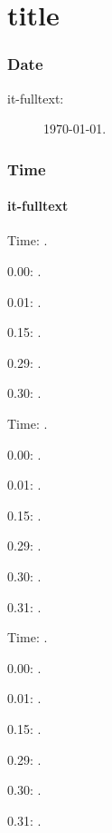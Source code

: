 \documentclass[italian]{article}
\begin{document}
\part{title}\section{Date}

\begin{description}
\item[it-fulltext:]
\today.
\end{description}

\section{Time}
\subsection{it-fulltext}
Time: \DTMcurrenttime.

0.00:  .

0.01:   . 

0.15:   . 

0.29:   . 

0.30:   .

Time: \DTMcurrenttime.

0.00:  .

0.01:   . 

0.15:   . 

0.29:   . 

0.30:   .

0.31:   .

Time: \DTMcurrenttime.

0.00:  .

0.01:   . 

0.15:   . 

0.29:   . 

0.30:   .

0.31:   .
\end{document}
